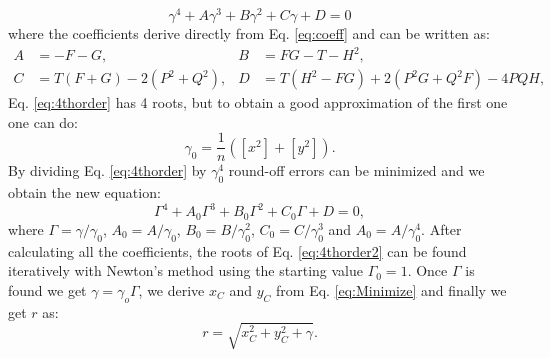 \begin{equation}\label{eq:4thorder}
    \gamma^4+A\gamma^3+B\gamma^2+C\gamma+D=0
\end{equation}
where the coefficients derive directly from Eq. \ref{eq:coeff} and can be written as:
\begin{align}\label{eq:coeff2}
A &= -F-G,&  B &=FG-T-H^2, \\
C&=T(F+G)-2(P^2+Q^2),      &  D&=T(H^2-FG)+2(P^2G+Q^2F)-4PQH, \nonumber  
\end{align}
Eq. \ref{eq:4thorder} has 4 roots, but to obtain a good approximation of the first one one can do:
\begin{equation}
    \gamma_0=\frac{1}{n}([x^2]+[y^2]).
\end{equation}
By dividing Eq. \ref{eq:4thorder} by $\gamma_0^4$ round-off errors can be minimized and we obtain the new equation:
\begin{equation}\label{eq:4thorder2}
    \Gamma^4+A_0\Gamma^3+B_0\Gamma^2+C_0\Gamma+D=0,
\end{equation}
where $\Gamma = \gamma/\gamma_0$, $A_0=A/\gamma_0$, $B_0=B/\gamma_0^2$, $C_0=C/\gamma_0^3$ and $A_0=A/\gamma_0^4$. After calculating all the coefficients, the roots of Eq. \ref{eq:4thorder2} can be found iteratively with Newton's method using the starting value $\Gamma_0=1$. Once $\Gamma$ is found we get $\gamma = \gamma_o\Gamma$, we derive $x_C$ and $y_C$ from Eq. \ref{eq:Minimize}  and finally we get $r$ as:
\begin{equation}
    r=\sqrt{x_C^2+y_C^2+\gamma}.
\end{equation}
\clearpage

